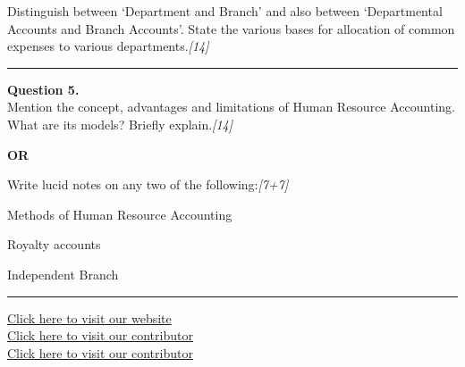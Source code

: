 \documentclass[11pt,a4paper]{article}
\newcommand{\pts}[1]{\hfill   \textit{[#1]}}
\begin{document}
Distinguish between `Department and Branch' and also between `Departmental Accounts and Branch Accounts'. State the various bases for allocation of common expenses to various departments.\pts{14}

\medskip\rule{\linewidth}{0.2pt}




\noindent   \textbf{Question 5.} \\
Mention the concept, advantages and limitations of Human Resource Accounting. What are its models? Briefly explain.\pts{14}

\centerline{   \textbf{OR}}

Write lucid notes on any two of the following:\pts{7+7}

\begin{parts}
  \item Methods of Human Resource Accounting
  \item Royalty accounts
  \item Independent Branch
\end{parts}

\vfill
\rule{\linewidth}{0.4pt}

\begin{center}\small
  \href{https://bhu-exam.vercel.app/}{Click here to visit our website}\\[4pt]
  \href{https://me-aryan.vercel.app/}{Click here to visit our contributor}\\[4pt]
  \href{https://quashan-me.vercel.app/}{Click here to visit our contributor}
\end{center}
\end{document}

